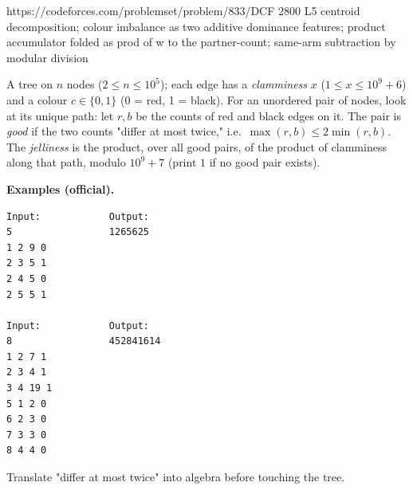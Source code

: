   {https://codeforces.com/problemset/problem/833/D}{CF 2800 L5}
  {centroid decomposition; colour imbalance as two additive dominance features; product accumulator folded as prod of w to the partner-count; same-arm subtraction by modular division}

\begin{problemstatement}
A tree on \(n\) nodes (\(2\le n\le 10^5\)); each edge has a \emph{clamminess}
\(x\) (\(1\le x\le 10^9{+}6\)) and a colour \(c\in\{0,1\}\) (0 = red, 1 = black). For an
unordered pair of nodes, look at its unique path: let \(r,b\) be the counts of red and
black edges on it. The pair is \emph{good} if the two counts "differ at most twice,"
i.e.\ \(\max(r,b)\le 2\min(r,b)\). The \emph{jelliness} is the product, over all good
pairs, of the product of clamminess along that path, modulo \(10^9{+}7\) (print \(1\) if
no good pair exists).

\textbf{Examples (official).}
\begin{verbatim}
Input:            Output:
5                 1265625
1 2 9 0
2 3 5 1
2 4 5 0
2 5 5 1

Input:            Output:
8                 452841614
1 2 7 1
2 3 4 1
3 4 19 1
5 1 2 0
6 2 3 0
7 3 3 0
8 4 4 0
\end{verbatim}
\end{problemstatement}

\begin{attemptgate}
Translate "differ at most twice" into algebra before touching the tree.
\end{attemptgate}

